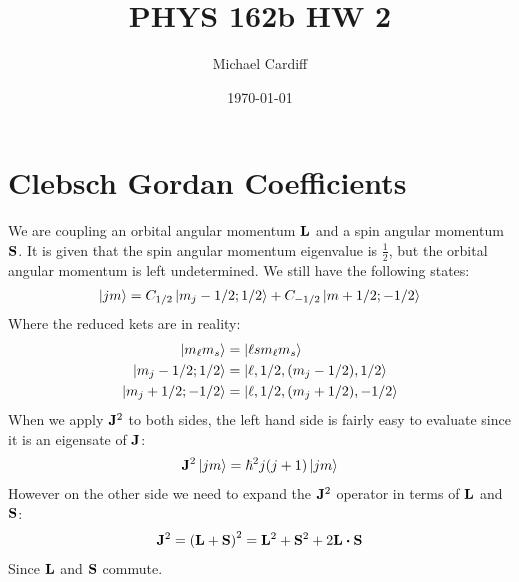 \documentclass[12pt]{article}
\title{\vspace{-3em}PHYS 162b HW 2}
\author{Michael Cardiff}
\date{\today}
\renewcommand{\l}{\ell}
\begin{document}
\maketitle

\section{Clebsch Gordan Coefficients}
We are coupling an orbital angular momentum $\vb{L}$ and a spin angular momentum $\vb{S}$. It is given that the spin angular momentum eigenvalue is $\frac12$, but the orbital angular momentum is left undetermined. We still have the following states:
\begin{align*}
  \ket{jm}=C_{1/2}\ket{m_j-1/2;1/2}+C_{-1/2}\ket{m+1/2;-1/2}
\end{align*}
Where the reduced kets are in reality:
\begin{align*}
  \ket{m_\l m_s}&=\ket{\l s m_\l m_s}\\
  \ket{m_j-1/2;1/2}&=\ket{\l,1/2,(m_j-1/2),1/2}\\
  \ket{m_j+1/2;-1/2}&=\ket{\l,1/2,(m_j+1/2),-1/2}
\end{align*}
When we apply $\vb{J}^2$ to both sides, the left hand side is fairly easy to evaluate since it is an eigensate of $\vb{J}$:
\begin{align*}
  \vb{J}^2\ket{jm}=\hbar^2j(j+1)\ket{jm}
\end{align*}
However on the other side we need to expand the $\vb{J}^2$ operator in terms of $\vb{L}$ and $\vb{S}$:
\begin{align*}
  \vb{J}^2=\qty(\vb{L+S})^2=\vb{L}^2+\vb{S}^2+2\vb{L\vdot S}
\end{align*}
Since $\vb{L}$ and $\vb{S}$ commute.
\end{document}
